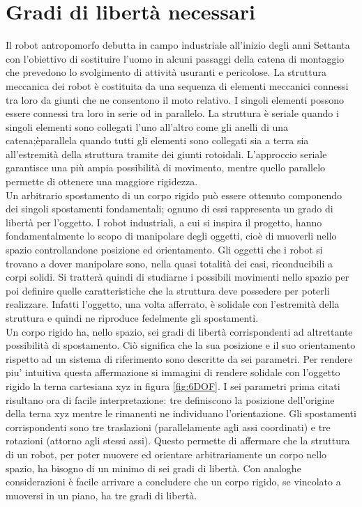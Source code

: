 \documentclass[%
corpo=11pt,
twoside,
 stile=classica,
oldstyle,
greek,%
]{toptesi}
\begin{document}
	\section{Gradi di libertà necessari}
	Il robot antropomorfo debutta in campo industriale all’inizio degli anni Settanta con l’obiettivo di sostituire l’uomo in alcuni passaggi della catena di montaggio che prevedono lo svolgimento di attività usuranti e pericolose. 
	La struttura meccanica dei robot è costituita da una sequenza di elementi meccanici connessi tra loro da giunti che ne consentono il moto relativo.
	 I singoli elementi possono essere connessi tra loro in serie od in parallelo.
	 La struttura è seriale quando i singoli elementi sono collegati l'uno all'altro come gli anelli di una catena;èparallela quando tutti gli elementi sono collegati sia a terra sia all'estremità della struttura tramite dei giunti rotoidali. L'approccio seriale garantisce una più ampia possibilità di movimento, mentre quello parallelo permette di ottenere una maggiore rigidezza.\\
	 Un arbitrario spostamento di un corpo rigido può essere ottenuto componendo dei singoli spostamenti fondamentali; ognuno di essi rappresenta un grado di libertà per l'oggetto. I robot industriali, a cui si inspira il progetto, hanno fondamentalmente lo scopo di manipolare degli oggetti, cioè di muoverli nello spazio controllandone posizione ed orientamento. Gli oggetti che i robot si trovano a dover manipolare sono, nella quasi totalità dei casi, riconducibili a corpi solidi. Si tratterà quindi di studiarne i possibili movimenti nello spazio per poi definire quelle caratteristiche che la struttura deve possedere per poterli realizzare. Infatti l'oggetto, una volta afferrato, è solidale con l'estremità della struttura e quindi ne riproduce fedelmente gli spostamenti. \\
	 Un corpo rigido ha, nello spazio, sei gradi di libertà corrispondenti ad altrettante possibilità di spostamento. Ciò significa che la sua posizione e il suo orientamento rispetto ad un sistema di riferimento sono descritte da sei parametri. Per rendere piu' intuitiva questa affermazione si immagini di rendere solidale con l'oggetto rigido la terna cartesiana xyz in figura \ref{fig:6DOF}. I sei parametri prima citati risultano ora di facile interpretazione: tre definiscono la posizione dell'origine della terna xyz mentre le rimanenti ne individuano l'orientazione. Gli spostamenti corrispondenti sono tre traslazioni (parallelamente agli assi coordinati) e tre rotazioni (attorno agli stessi assi). Questo permette di affermare che la struttura di un robot, per poter muovere ed orientare arbitrariamente un corpo nello spazio, ha bisogno di un minimo di sei gradi di libertà. Con analoghe considerazioni è facile arrivare a concludere che un corpo rigido, se vincolato a muoversi in un piano, ha tre gradi di libertà. 
	 
\end{document}

